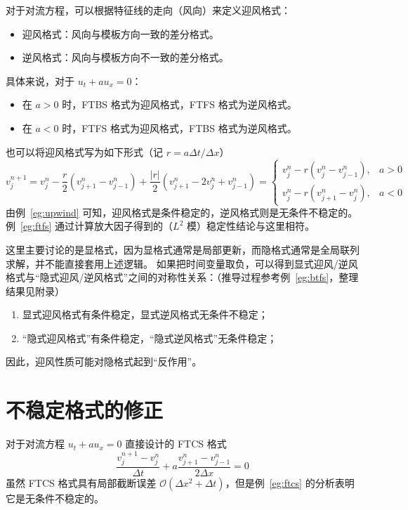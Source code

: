对于对流方程，可以根据特征线的走向（风向）来定义迎风格式：
\begin{itemize}
    \item 迎风格式：风向与模板方向一致的差分格式。
    \item 逆风格式：风向与模板方向不一致的差分格式。
\end{itemize}
具体来说，对于 $u_t + a u_x = 0$：
\begin{itemize}
    \item 在 $a > 0$ 时，FTBS 格式为迎风格式，FTFS 格式为逆风格式。
    \item 在 $a < 0$ 时，FTFS 格式为迎风格式，FTBS 格式为逆风格式。
\end{itemize}
也可以将迎风格式写为如下形式（记 $r = a \Delta t / \Delta x$）
\[
    v_j^{n+1} = v_j^n - \frac{r}2 (v_{j+1}^n - v_{j-1}^{n}) + \frac{|r|}2 (v_{j+1}^n - 2 v_j^n + v_{j-1}^{n})
    =
    \begin{cases}
        v_j^n - r (v_{j}^n - v_{j-1}^{n}), & a > 0 \\
        v_j^n - r (v_{j+1}^n - v_{j}^{n}), & a < 0
    \end{cases}
\]
由例~\ref{eg:upwind} 可知，迎风格式是条件稳定的，逆风格式则是无条件不稳定的。
例~\ref{eg:ftfs} 通过计算放大因子得到的（$L^2$ 模）稳定性结论与这里相符。

\begin{remark}
    这里主要讨论的是显格式，因为显格式通常是局部更新，而隐格式通常是全局联列求解，并不能直接套用上述逻辑。
    如果把时间变量取负，可以得到显式迎风/逆风格式与“隐式迎风/逆风格式”之间的对称性关系：（推导过程参考例~\ref{eg:btfs}，整理结果见附录）
    \begin{enumerate}
        \item 显式迎风格式有条件稳定，显式逆风格式无条件不稳定；
        \item “隐式迎风格式”有条件稳定，“隐式逆风格式”无条件稳定；
    \end{enumerate}
    因此，迎风性质可能对隐格式起到“反作用”。
\end{remark}

\section{不稳定格式的修正}

对于对流方程 $u_t + a u_x = 0$ 直接设计的 FTCS 格式
\[
    \frac{v_j^{n+1}-v_j^n}{\Delta t} + a \frac{v_{j+1}^n-v_{j-1}^n}{2\Delta x} = 0
\]
虽然 FTCS 格式具有局部截断误差 $\mathcal{O}(\Delta x^2 + \Delta t)$，但是例~\ref{eg:ftcs} 的分析表明它是无条件不稳定的。

